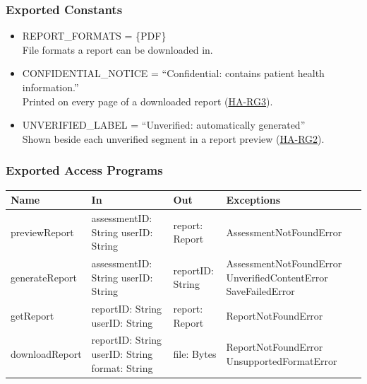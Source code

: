 \documentclass[12pt, titlepage]{article}
\newcommand{\hazref}[1]{\href{https://github.com/Nour-Fawaz/MacaBoca/blob/main/pdfs/HazardAnalysis/HazardAnalysis.pdf}{#1}}
\begin{document}
\subsubsection{Exported Constants}
\begin{itemize}
\item REPORT\_FORMATS = \{PDF\}\\
File formats a report can be downloaded in.
\item CONFIDENTIAL\_NOTICE = ``Confidential: contains patient health information.''\\
Printed on every page of a downloaded report (\hazref{HA-RG3}).
\item UNVERIFIED\_LABEL = ``Unverified: automatically generated''\\
Shown beside each unverified segment in a report preview (\hazref{HA-RG2}).
\end{itemize}

\subsubsection{Exported Access Programs}
{\small
\begin{longtable}{>{\raggedright\arraybackslash}p{3.4cm} >{\raggedright\arraybackslash}p{4.3cm} >{\raggedright\arraybackslash}p{3.2cm} >{\raggedright\arraybackslash}p{4.3cm}}
\hline
\textbf{Name} & \textbf{In} & \textbf{Out} & \textbf{Exceptions} \\
\hline
\endhead
previewReport & assessmentID: String \newline userID: String & report: Report & AssessmentNotFoundError \\[4pt]
generateReport & assessmentID: String \newline userID: String & reportID: String & AssessmentNotFoundError \newline UnverifiedContentError \newline SaveFailedError \\[4pt]
getReport & reportID: String \newline userID: String & report: Report & ReportNotFoundError \\[4pt]
downloadReport & reportID: String \newline userID: String \newline format: String & file: Bytes & ReportNotFoundError \newline UnsupportedFormatError \\[4pt]
\hline
\end{longtable}
}
\end{document}
